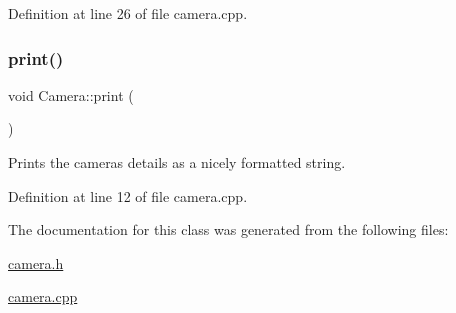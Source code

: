 Definition at line 26 of file camera.\+cpp.

\mbox{\label{class_camera_a905d2a0f8677aaad1ee17eb2a842efe5}} 
\subsubsection{\texorpdfstring{print()}{print()}}
{\footnotesize\ttfamily void Camera\+::print (\begin{DoxyParamCaption}{ }\end{DoxyParamCaption})}



Prints the camera\textquotesingle{}s details as a nicely formatted string. 



Definition at line 12 of file camera.\+cpp.



The documentation for this class was generated from the following files\+:\begin{DoxyCompactItemize}
\item 
\mbox{\hyperlink{camera_8h}{camera.\+h}}\item 
\mbox{\hyperlink{camera_8cpp}{camera.\+cpp}}\end{DoxyCompactItemize}
